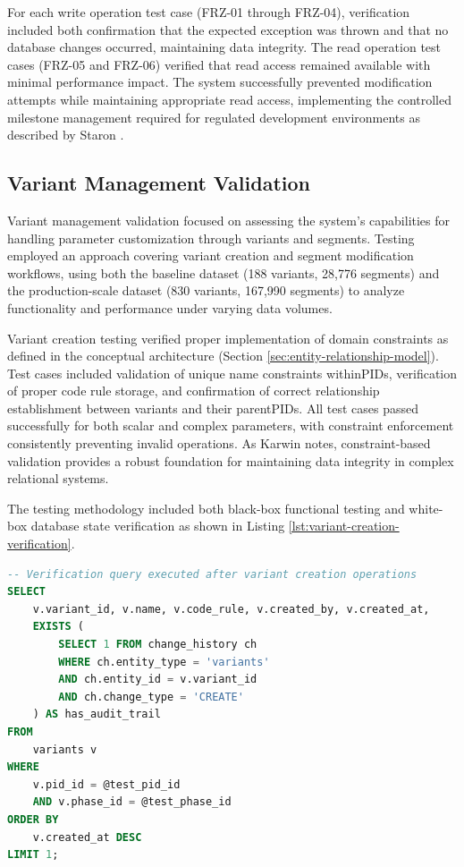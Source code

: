 For each write operation test case (FRZ-01 through FRZ-04), verification included both confirmation that the expected exception was thrown and that no database changes occurred, maintaining data integrity. The read operation test cases (FRZ-05 and FRZ-06) verified that read access remained available with minimal performance impact. The system successfully prevented modification attempts while maintaining appropriate read access, implementing the controlled milestone management required for regulated development environments as described by Staron \cite{staron2021automotive}.

\subsection{Variant Management Validation}
\label{subsec:variant-management-validation}

Variant management validation focused on assessing the system's capabilities for handling parameter customization through variants and segments. Testing employed an approach covering variant creation and segment modification workflows, using both the baseline dataset (188 variants, 28,776 segments) and the production-scale dataset (830 variants, 167,990 segments) to analyze functionality and performance under varying data volumes.

Variant creation testing verified proper implementation of domain constraints as defined in the conceptual architecture (Section \ref{sec:entity-relationship-model}). Test cases included validation of unique name constraints within\acp{PID}, verification of proper code rule storage, and confirmation of correct relationship establishment between variants and their parent\acp{PID}. All test cases passed successfully for both scalar and complex parameters, with constraint enforcement consistently preventing invalid operations. As Karwin \cite{karwin2010sql} notes, constraint-based validation provides a robust foundation for maintaining data integrity in complex relational systems.

The testing methodology included both black-box functional testing and white-box database state verification as shown in Listing \ref{lst:variant-creation-verification}.

\begin{lstlisting}[language=SQL, caption={Variant Creation Verification Query}, label={lst:variant-creation-verification}]
-- Verification query executed after variant creation operations
SELECT 
    v.variant_id, v.name, v.code_rule, v.created_by, v.created_at,
    EXISTS (
        SELECT 1 FROM change_history ch 
        WHERE ch.entity_type = 'variants' 
        AND ch.entity_id = v.variant_id
        AND ch.change_type = 'CREATE'
    ) AS has_audit_trail
FROM 
    variants v
WHERE 
    v.pid_id = @test_pid_id
    AND v.phase_id = @test_phase_id
ORDER BY 
    v.created_at DESC
LIMIT 1;
\end{lstlisting}

